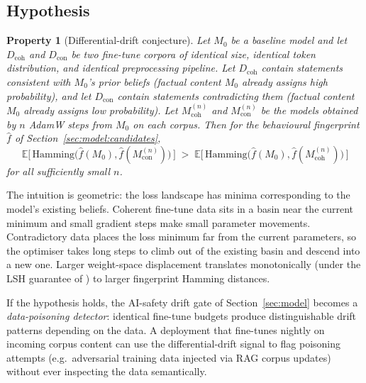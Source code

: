 \documentclass[11pt,a4paper]{article}
\newtheorem{property}{Property}
\begin{document}
\subsection{Hypothesis}
\label{sec:poisoning:hypothesis}

\begin{property}[Differential\nobreakdash-drift conjecture]
  Let $M_0$ be a baseline model and let $D_{\mathrm{coh}}$ and
  $D_{\mathrm{con}}$ be two fine\nobreakdash-tune corpora of identical
  size, identical token distribution, and identical preprocessing
  pipeline.  Let $D_{\mathrm{coh}}$ contain statements consistent
  with $M_0$'s prior beliefs (factual content $M_0$ already assigns
  high probability), and let $D_{\mathrm{con}}$ contain statements
  contradicting them (factual content $M_0$ already assigns low
  probability).  Let $M_{\mathrm{coh}}^{(n)}$ and $M_{\mathrm{con}}^{(n)}$
  be the models obtained by $n$ AdamW steps from $M_0$ on each
  corpus.  Then for the behavioural fingerprint $\hat{f}$ of
  Section~\ref{sec:model:candidates},
  \[
    \mathbb{E}\bigl[\, \mathrm{Hamming}\bigl(\hat{f}(M_0),
                                              \hat{f}(M_{\mathrm{con}}^{(n)})\bigr) \,\bigr]
    \;>\;
    \mathbb{E}\bigl[\, \mathrm{Hamming}\bigl(\hat{f}(M_0),
                                              \hat{f}(M_{\mathrm{coh}}^{(n)})\bigr) \,\bigr]
  \]
  for all sufficiently small $n$.
\end{property}

The intuition is geometric: the loss landscape has minima
corresponding to the model's existing beliefs.  Coherent fine\nobreakdash-tune
data sits in a basin near the current minimum and small gradient
steps make small parameter movements.  Contradictory data places
the loss minimum far from the current parameters, so the optimiser
takes long steps to climb out of the existing basin and descend
into a new one.  Larger weight\nobreakdash-space displacement
translates monotonically (under the LSH guarantee of
\cite{charikar2002simhash}) to larger fingerprint Hamming
distances.

If the hypothesis holds, the AI\nobreakdash-safety drift gate of
Section~\ref{sec:model} becomes a \emph{data\nobreakdash-poisoning
detector}: identical fine\nobreakdash-tune budgets produce
distinguishable drift patterns depending on the data.  A
deployment that fine\nobreakdash-tunes nightly on incoming corpus
content can use the differential\nobreakdash-drift signal to flag
poisoning attempts (e.g.\ adversarial training data injected via
RAG corpus updates) without ever inspecting the data semantically.
\end{document}
